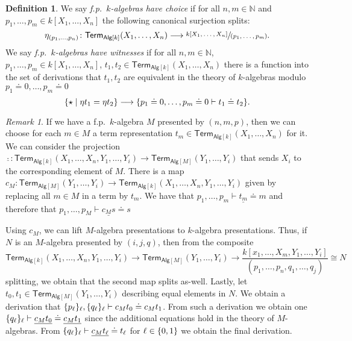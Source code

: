 \documentclass[10pt,a4paper]{article}
\theoremstyle{definition}
\newtheorem{definition}[theorem]{Definition}
\theoremstyle{remark}
\newtheorem{remark}[theorem]{Remark}
\newcommand{\nats}{\mathbb{N}}
\newcommand{\Alg}{\mathsf{Alg}}
\DeclarePairedDelimiter\set{\{}{\}}
\newcommand\Term{\mathsf{Term}}
\begin{document}
\begin{definition}
  We say \emph{f.p.~\(k\)-algebras have choice} if for all \(n, m \in \nats\) and \(p_1, \ldots, p_m \in k[X_1, \ldots, X_n]\) the following canonical surjection splits:
  \[
    \eta_{(p_1, \ldots, p_n)} \colon \Term_{\Alg[k]}(X_1, \ldots, X_n) \longrightarrow \sfrac{k[X_1, \ldots, X_n]}{(p_1, \ldots, p_m)}.
  \]
  We say \emph{f.p.~\(k\)-algebras have witnesses} if for all \(n, m \in \nats\), \(p_1, \ldots, p_m \in k[X_1, \ldots, X_n]\), \(t_1, t_2 \in \Term_{\Alg[k]}(X_1, \ldots, X_n)\) there is a function into the set of derivations that \(t_1, t_2\) are equivalent in the theory of \(k\)-algebras modulo \(p_1 \doteq 0, \ldots, p_m \doteq 0\)
  \[
    \set{\star \mid \eta t_1 = \eta t_2 } \longrightarrow \set{ p_1 \doteq 0, \ldots, p_m \doteq 0 \vdash t_1 \doteq t_2 }. 
  \]
\end{definition}
\begin{remark}
  If we have a f.p.~\(k\)-algebra \(M\) presented by \((n, m, p)\), then we can choose for each \(m \in M\) a term representation \(t_m \in \Term_{\Alg[k]}(X_1, \ldots, X_n)\) for it.
  We can consider the projection \(\underline{\cdot} \colon \Term_{\Alg[k]}(X_1, \ldots, X_n, Y_1, \ldots, Y_i) \to \Term_{\Alg[M]}(Y_1, \ldots, Y_i)\) that sends \(X_i\) to the corresponding element of \(M\).
  There is a map \(c_M \colon \Term_{\Alg[M]}(Y_1, \ldots, Y_i) \to \Term_{\Alg[k]}(X_1, \ldots, X_n, Y_1, \ldots, Y_i)\) given by replacing all \(m \in M\) in a term by \(t_m\).
  We have that \(p_1, \ldots, p_m \vdash \underline{t_m} \doteq m\) and therefore that \(p_1, \ldots, p_M \vdash \underline{c_M s} \doteq s\)
  
  Using \(c_M\), we can lift \(M\)-algebra presentations to \(k\)-algebra presentations.
  Thus, if \(N\) is an \(M\)-algebra presented by \((i, j, q)\), then from the composite
  \[
    \Term_{\Alg[k]}(X_1, \ldots, X_n, Y_1, \ldots, Y_i) \longrightarrow \Term_{\Alg[M]}(Y_1, \ldots, Y_i) \longrightarrow \frac{k[x_1, \ldots, X_m, Y_1, \ldots, Y_i]}{(p_1, \ldots, p_n, q_1, \ldots, q_j)} \cong N
  \]
  splitting, we obtain that the second map splits as-well.
  Lastly, let \(t_0, t_1 \in \Term_{\Alg[M]}(Y_1, \ldots, Y_i)\) describing equal elements in \(N\).
  We obtain a derivation that \(\set{p_\ell}_\ell, \set{q_\ell}_\ell \vdash c_Mt_0 \doteq c_M t_1\).
  From such a derivation we obtain one \(\set{q_\ell}_\ell \vdash \underline{c_Mt_0} \doteq \underline{c_Mt_1}\) since the additional equations hold in the theory of \(M\)-algebras.
  From \(\set{q_\ell}_\ell \vdash \underline{c_Mt_\ell} \doteq t_\ell\) for \(\ell \in \set{0,1}\) we obtain the final derivation.
\end{remark}
\end{document}
